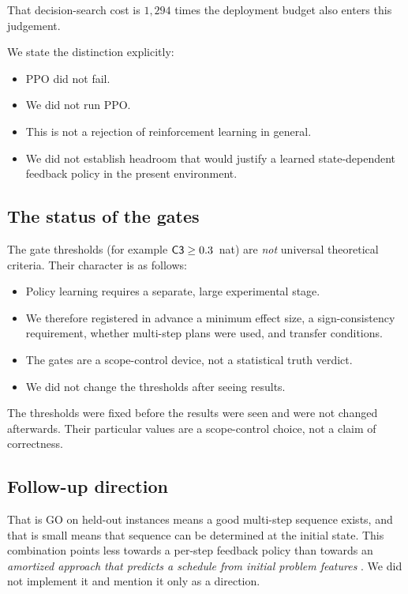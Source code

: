 That decision-search cost is $1{,}294$ times the deployment budget also enters this
judgement.

We state the distinction explicitly:

\begin{itemize}
  \item PPO did not fail.
  \item We did not run PPO.
  \item This is not a rejection of reinforcement learning in general.
  \item We did not establish headroom that would justify a learned state-dependent
        feedback policy in the present environment.
\end{itemize}

\subsection{The status of the gates}

The gate thresholds (for example $\textsf{C3} \geq 0.3$~nat) are \emph{not} universal
theoretical criteria. Their character is as follows:

\begin{itemize}
  \item Policy learning requires a separate, large experimental stage.
  \item We therefore registered in advance a minimum effect size, a sign-consistency
        requirement, whether multi-step plans were used, and transfer conditions.
  \item The gates are a scope-control device, not a statistical truth verdict.
  \item We did not change the thresholds after seeing results.
\end{itemize}

The thresholds were fixed before the results were seen and were not changed
afterwards. Their particular values are a scope-control choice, not a claim of
correctness.

\subsection{Follow-up direction}
\label{sec:followup}

That  is GO on held-out instances means a good multi-step sequence exists,
and that  is small means that sequence can be determined at the initial
state. This combination points less towards a per-step feedback policy than towards
an \emph{amortized approach that predicts a schedule from initial problem features}
\citep{amos2023amortized,andrychowicz2016l2l,bae2022apo}. We did not implement it
and mention it only as a direction.
